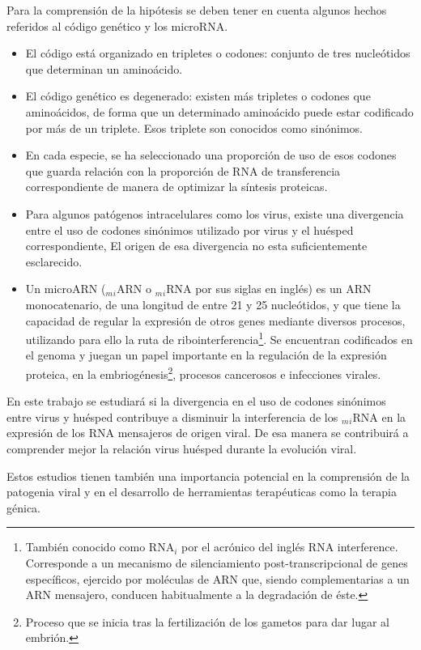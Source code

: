 \documentclass[12pt,a4paper]{article}
\begin{document}
\par Para la comprensión de la hipótesis se deben tener en cuenta algunos hechos referidos al código genético y los microRNA.
\begin{itemize}
	\item El código está organizado en tripletes o codones: conjunto de tres nucleótidos que determinan un aminoácido.
	\item El código genético es degenerado: existen más tripletes o codones que aminoácidos, de forma que un determinado aminoácido puede estar codificado 				por más de un triplete. Esos triplete son conocidos como sinónimos. 
	\item En cada especie, se ha seleccionado una proporción de uso de esos codones que guarda relación con la proporción de RNA de transferencia  				correspondiente de manera de optimizar la síntesis proteicas.
	\item Para algunos patógenos intracelulares como los virus, existe una divergencia entre el uso de codones sinónimos utilizado por virus y el huésped 				correspondiente, El origen de esa divergencia no esta suficientemente esclarecido.
	\item Un microARN ($_m$$_i$ARN o $_m$$_i$RNA por sus siglas en inglés) es un ARN monocatenario, de una longitud de entre 21 y 25 nucleótidos, y que 				tiene la capacidad de regular la expresión de otros genes mediante diversos procesos, utilizando para ello la ruta de 							ribointerferencia\footnote{También conocido como RNA$_i$ por el acrónico del inglés RNA interference. Corresponde a un mecanismo 							de silenciamiento post-transcripcional de genes específicos, ejercido por moléculas de ARN que, siendo complementarias a un ARN 						mensajero, conducen habitualmente a la degradación de éste.}. Se encuentran codificados en el genoma y juegan un papel importante 							en la regulación de la expresión proteica, en la embriogénesis\footnote{Proceso que se inicia tras la fertilización de los gametos 							para dar lugar al embrión.}, procesos cancerosos e infecciones virales.
\end{itemize}

\par En este trabajo se estudiará si la divergencia en el uso de codones sinónimos entre virus y huésped contribuye a disminuir la interferencia de los $_m$$_i$RNA en la expresión de los  RNA mensajeros de origen viral. De esa manera se contribuirá a comprender mejor la relación virus huésped durante la evolución viral.
\par Estos estudios tienen también una importancia potencial en la comprensión de la patogenia viral y en el desarrollo de herramientas terapéuticas como la terapia génica.
\end{document}
